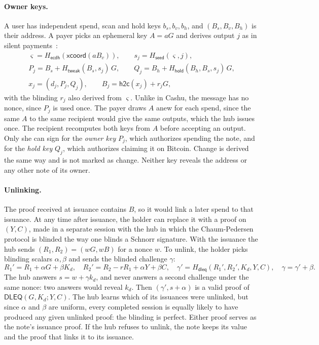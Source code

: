 \documentclass[11pt]{article}
\newcommand{\Ht}[1]{H_{\mathsf{#1}}}
\newcommand{\htc}{\mathsf{h2c}}
\newcommand{\DLEQ}{\mathsf{DLEQ}}
\begin{document}
\paragraph{Owner keys.} A user has independent spend, scan and hold keys $b_s,b_v,b_h$, and $(B_s,B_v,B_h)$ is their address. A payer picks an ephemeral key $A=aG$ and derives output $j$ as in silent payments~\cite{bip352}:
\begin{gather*}
\varsigma = \Ht{ecdh}(\mathsf{xcoord}(aB_v)),\qquad s_j = \Ht{seed}(\varsigma, j),\\
P_j = B_s + \Ht{tweak}(B_s, s_j)\,G,\qquad Q_j = B_h + \Ht{hold}(B_h,B_s,s_j)\,G,\\
x_j = (d_j, P_j, Q_j),\qquad B_j = \htc(x_j) + r_jG,
\end{gather*}
with the blinding $r_j$ also derived from $\varsigma$. Unlike in Cashu, the message has no nonce, since $P_j$ is used once. The payer draws $A$ anew for each spend, since the same $A$ to the same recipient would give the same outputs, which the hub issues once. The recipient recomputes both keys from $A$ before accepting an output. Only she can sign for the \emph{owner key} $P_j$, which authorizes spending the note, and for the \emph{hold key} $Q_j$, which authorizes claiming it on Bitcoin. Change is derived the same way and is not marked as change. Neither key reveals the address or any other note of its owner.

\paragraph{Unlinking.} The proof received at issuance contains $B$, so it would link a later spend to that issuance. At any time after issuance, the holder can replace it with a proof on $(Y,C)$, made in a separate session with the hub in which the Chaum-Pedersen protocol is blinded the way one blinds a Schnorr signature. With the issuance the hub sends $(R_1,R_2)=(wG,wB)$ for a nonce $w$. To unlink, the holder picks blinding scalars $\alpha,\beta$ and sends the blinded challenge $\gamma$:
\[
R_1' = R_1 + \alpha G + \beta K_d,\quad R_2' = R_2 - rR_1 + \alpha Y + \beta C,\quad \gamma' = \Ht{dleq}(R_1', R_2', K_d, Y, C),\quad \gamma = \gamma' + \beta .
\]
The hub answers $s=w+\gamma k_d$, and never answers a second challenge under the same nonce: two answers would reveal $k_d$. Then $(\gamma',s+\alpha)$ is a valid proof of $\DLEQ(G,K_d;Y,C)$. The hub learns which of its issuances were unlinked, but since $\alpha$ and $\beta$ are uniform, every completed session is equally likely to have produced any given unlinked proof: the blinding is perfect. Either proof serves as the note's issuance proof. If the hub refuses to unlink, the note keeps its value and the proof that links it to its issuance.
\end{document}
